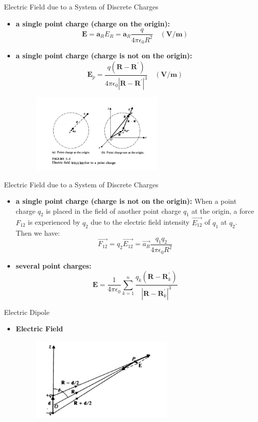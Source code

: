 \documentclass[xcolor={dvipsnames}]{beamer}
\begin{document}
\begin{frame}{Electric Field due to a System of Discrete Charges}
\begin{itemize}
\item \textbf{a single point charge (charge on the origin):}
\[
\mathbf{E}=\mathbf{a}_{R} E_{R}=\mathbf{a}_{R} \frac{q}{4 \pi \epsilon_{0} R^{2}} \quad(\mathbf{V} / \mathbf{m})
\]
\item \textbf{a single point charge (charge is not on the origin):}
\[
\mathbf{E}_{p}=\frac{q\left(\mathbf{R}-\mathbf{R}^{\prime}\right)}{4 \pi \epsilon_{0}\left|\mathbf{R}-\mathbf{R}^{\prime}\right|^{3}} \quad(\mathbf{V} / \mathbf{m})
\]
\begin{figure}[H]
\centering
\includegraphics[width=6.5cm]{3_1.png}
\end{figure}
\end{itemize}
\end{frame}
\begin{frame}{Electric Field due to a System of Discrete Charges}
\begin{itemize}
\item \textbf{a single point charge (charge is not on the origin):}
When a point charge $q_2$ is placed in the field of another point charge $q_1$ at the origin, a force $F_{12}$ is experienced by $q_2$ due to the electric field intensity $\vec{E_{12}}$ of $q_1$ at $q_2$. Then we have:
$$\vec{F_{12}} = q_2\vec{E_{12}} = \vec{a_R}\frac{q_1q_2}{4\pi \epsilon_0 R^2}$$
\item \textbf{several point charges:}
\[
\mathbf{E}=\frac{1}{4 \pi \epsilon_{0}} \sum_{k=1}^{n} \frac{q_{k}\left(\mathbf{R}-\mathbf{R}_{k}^{\prime}\right)}{\left|\mathbf{R}-\mathbf{R}_{k}^{\prime}\right|^{3}}
\]
\end{itemize}
\end{frame}
\begin{frame}{Electric Dipole}
\begin{itemize}
\item \textbf{Electric Field}
\begin{figure}[H]
\centering
\includegraphics[width=7cm]{3_2.png}
\end{figure}
\end{itemize}
\end{frame}
\end{document}

